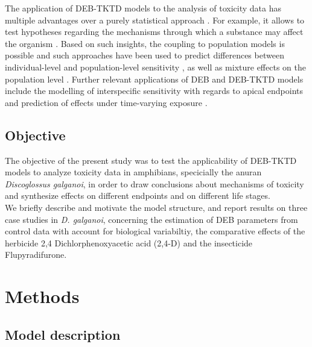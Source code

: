 \documentclass[preprint,12pt]{elsarticle}
\begin{document}
% 
The application of DEB-TKTD models to the analysis of toxicity data has multiple advantages over a purely statistical approach \citep{jagerGoodReasonsBan2011,jagerItsTimeMoving2025}. 
For example, it allows to test hypotheses regarding the mechanisms through which a substance may affect the organism 
\citep{kochMakingSenseLifeHistory2021,weighmanUsingDynamicEnergy2023}. 
Based on such insights, the coupling to population models is possible \citep{jagerExtrapolatingToxicEffects2010,martinExtrapolatingEcotoxicologicalEffects2013}
and such approaches have been used to predict differences between individual-level and population-level sensitivity \citep{pereiraUnexpectedAbsenceNickel2019}, 
as well as mixture effects on the population level \citep{vlaeminckPredictingCombinedEffects2022}. Further relevant applications of DEB and DEB-TKTD models 
include the modelling of interspecific sensitivity with regards to apical endpoints \citep{zubrodBioQSARs20Unlocking2024} and prediction of effects 
under time-varying exposure \citep{romoliEnvironmentalRiskAssessment2024a}.
%
\subsection{Objective}
%
The objective of the present study was to test the applicability of DEB-TKTD models to 
analyze toxicity data in amphibians, specicially the anuran \textit{Discoglossus galganoi}, 
in order to draw conclusions about mechanisms of toxicity and synthesize effects 
on different endpoints and on different life stages. \\ 
We briefly describe and motivate the model structure, and report results on three case studies in \textit{D. galganoi}, 
concerning the estimation of DEB parameters from control data with account for biological variabiltiy,
the comparative effects of the herbicide 2,4 Dichlorphenoxyacetic acid (2,4-D) and the insecticide Flupyradifurone.
%
\section{Methods}
%
\subsection{Model description}
%
\end{document}
